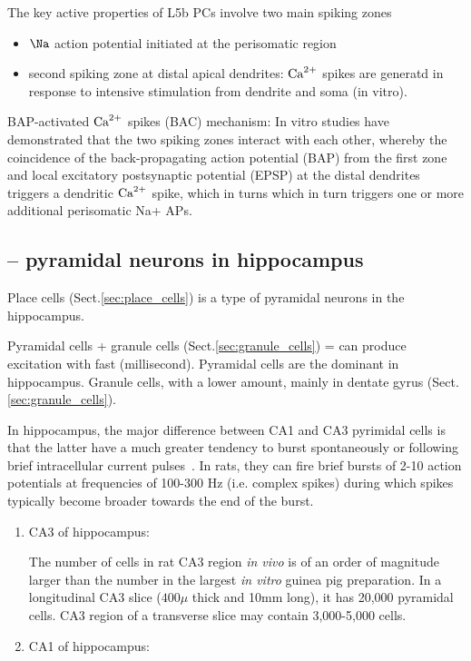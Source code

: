 The key active properties of L5b PCs involve two main spiking zones
\begin{itemize}
  \item $\Na$ action potential initiated at the perisomatic region
      
  \item second spiking zone at distal apical dendrites: ${\text{Ca}^{2+}}$ spikes are
  generatd in response to intensive stimulation from dendrite and soma (in
  vitro).
\end{itemize}

BAP-activated ${\text{Ca}^{2+}}$ spikes (BAC) mechanism: In vitro studies have demonstrated
that the two spiking zones interact with each other, whereby the coincidence of
the back-propagating action potential (BAP) from the first zone and local
excitatory postsynaptic potential (EPSP) at the distal dendrites triggers a
dendritic ${\text{Ca}^{2+}}$ spike, which in turns which in turn triggers one or more
additional perisomatic Na+ APs.



\subsection{-- pyramidal neurons in hippocampus}
\label{sec:pyramidal-neuron-hippocampus}

Place cells (Sect.\ref{sec:place_cells}) is a type of pyramidal neurons in the
hippocampus.

Pyramidal cells + granule cells (Sect.\ref{sec:granule_cells}) = can produce
excitation with fast (millisecond). Pyramidal cells are the dominant in
hippocampus. Granule cells, with a lower amount, mainly in dentate
gyrus (Sect.\ref{sec:granule_cells}).

In hippocampus, the major difference between CA1 and CA3 pyrimidal cells is that
the latter have a much greater tendency to burst spontaneously or following
brief intracellular current pulses~\cite{wong1981agh}. In rats, they can fire
brief bursts    of 2-10 action    potentials    at frequencies     of 100-300 Hz
(i.e. complex spikes) during which    spikes typically become     
broader towards the end of  the burst.
  \begin{enumerate}  
  \item CA3 of hippocampus:

The number of cells in rat CA3 region {\it in vivo} is of an order of
magnitude larger than the number in the largest {\it in vitro} guinea
pig preparation. In a longitudinal CA3 slice ($400\mu$ thick and 10mm
long), it has 20,000 pyramidal cells. CA3 region of a transverse slice
may contain 3,000-5,000 cells.
  
  \item CA1 of hippocampus:
  \end{enumerate}
  

